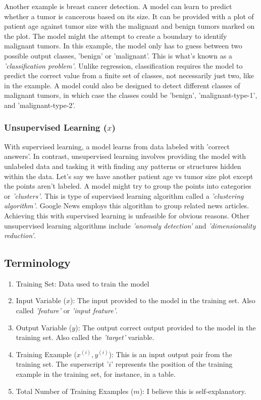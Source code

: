 \documentclass{article}
\begin{document}
Another example is breast cancer detection. A model can learn to predict whether a tumor is cancerous based on its size. It can be provided with a plot of patient age against tumor size with the malignant and benign tumors marked on the plot. The model might the attempt to create a boundary to identify malignant tumors. In this example, the model only has to guess between two possible output classes, 'benign' or 'malignant'. This is what's known as a \textit{'classification problem'}. Unlike regression, classification requires the model to predict the correct value from a finite set of classes, not necessarily just two, like in the example. A model could also be designed to detect different classes of malignant tumors, in which case the classes could be 'benign', 'malignant-type-1', and 'malignant-type-2'.

\subsubsection{Unsupervised Learning ($x$)}
With supervised learning, a model learns from data labeled with 'correct answers'. In contrast, unsupervised learning involves providing the model with unlabeled data and tasking it with finding any patterns or structures hidden within the data. Let's say we have another patient age vs tumor size plot except the points aren't labeled. A model might try to group the points into categories or \textit{'clusters'}. This is type of supervised learning algorithm called a \textit{'clustering algorithm'}. Google News employs this algorithm to group related news articles. Achieving this with supervised learning is unfeasible for obvious reasons. Other unsupervised learning algorithms include \textit{'anomaly detection'} and \textit{'dimensionality reduction'}.

\subsection{Terminology}

\begin{enumerate}

\item Training Set: Data used to train the model
\item Input Variable ($x$): The input provided to the model in the training set. Also called \textit{'feature'} or \textit{'input feature'}.
\item Output Variable ($y$):  The output correct output provided to the model in the training set. Also called the \textit{'target'} variable.
\item Training Example ($x^{(i)}, y^{(i)}$): This is an input output pair from the training set. The superscript '$i$' represents the position of the training example in the training set, for instance, in a table.
\item Total Number of Training Examples ($m$): I believe this is self-explanatory.

\end{enumerate}
\end{document}
